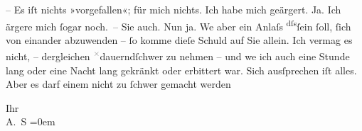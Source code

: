 \pstart
           – Es iſt nichts »vorgefallen«; für mich nichts. Ich habe mich geärgert.
               Ja. Ich ärgere mich{ }ſogar noch. – Sie auch. Nun ja. We{\geminationn}
               aber ein Anlaſs \substVorne{}\textsuperscript{dſs}\substDazwischen{}ſein{ }ſoll\substHinten{},{ }ſich von einander abzu{\pb}wenden –{ }ſo
               komme dieſe Schuld auf Sie allein. Ich vermag es nicht, – dergleichen \substVorne{}\textsuperscript{\textcolor{gray}{×}}\substDazwischen{}dauernd\substHinten{}{ }ſchwer zu nehmen – und we{\geminationn} ich auch \strikeout{\textcolor{gray}{×}\-\textcolor{gray}{×}\-\textcolor{gray}{×}\-\textcolor{gray}{×}\-\textcolor{gray}{×}\-\textcolor{gray}{×}\-\textcolor{gray}{×}\-\textcolor{gray}{×}\-\textcolor{gray}{×}}{ }\strikeout{\textcolor{gray}{und}} eine Stunde lang oder eine Nacht lang gekränkt oder erbittert war. Sich
               ausſprechen iſt alles. Aber es darf einem nicht {\pb}zu{ }ſchwer gemacht werden\pend
           
\pstart
           Ihr {\\[\baselineskip]}\spacefill\mbox{A. S}\pend
           \leftskip=0em{}\endnumbering{}  \newcommand{\dateiname}{L02989}\newcommand{\titel}{Arthur Schnitzler an Felix Salten, 10. 11. 1903}\newcommand{\editorInnen}{Martin Anton Müller und Laura Untner}
